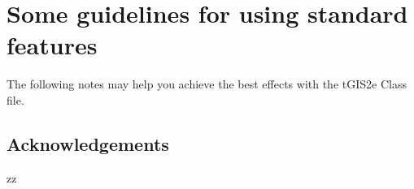 \documentclass[]{tGIS2e}
\begin{document}
\section[]{Some guidelines for using standard features}

The following notes may help you achieve the best effects with the tGIS2e Class file.










\subsection{Acknowledgements}
zz
\end{document}
